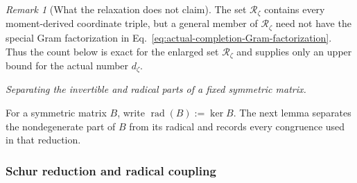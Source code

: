 \documentclass[11pt]{article}
\newcommand{\1}{\mathbf 1}
\theoremstyle{plain}
\theoremstyle{definition}
\theoremstyle{remark}
\newtheorem{remark}[theorem]{Remark}
\begin{document}
\begin{remark}[What the relaxation does not claim]
The set $\mathcal R_{\zeta}$ contains every moment-derived coordinate triple,
but a general member of $\mathcal R_{\zeta}$ need not have the special Gram
factorization in Eq.~\eqref{eq:actual-completion-Gram-factorization}.  Thus the
count below is exact for the enlarged set $\mathcal R_{\zeta}$ and supplies
only an upper bound for the actual number $d_{\zeta}$.
\end{remark}

\medskip\noindent\emph{Separating the invertible and radical parts of a fixed symmetric matrix.}\par
For a symmetric matrix $B$, write
$\operatorname{rad}(B):=\ker B$.  The next lemma separates the nondegenerate
part of $B$ from its radical and records every congruence used in that
reduction.

\subsubsection{Schur reduction and radical coupling}
\label{subsubsec:odd-schur-radical-reduction}
\end{document}
